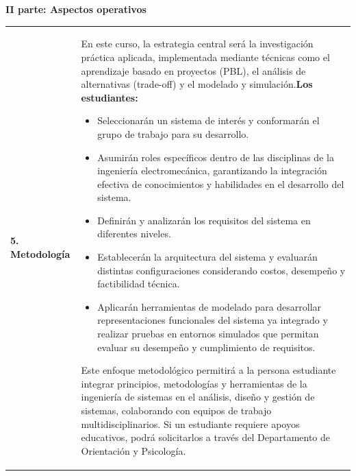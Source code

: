 \documentclass[letterpaper]{article}%
\begin{document}
\newpage%
\par\fontsize{14}{0}\selectfont \textbf{\textcolor{parte}{II parte: Aspectos operativos}}%
\vspace*{4mm}%
\newline%
\fontsize{10}{12}\selectfont %
\begin{tabularx}{\textwidth}{p{3cm}p{13cm}}%
\par\fontsize{12}{14}\selectfont \textbf{\textcolor{parte}{5. Metodología}}&En este curso, la estrategia central será la investigación práctica aplicada, implementada mediante técnicas como el aprendizaje basado en proyectos (PBL), el análisis de alternativas (trade-off) y el modelado y simulación.\newline\newline \textbf{Los estudiantes:}\begin{itemize}\item Seleccionarán un sistema de interés y conformarán el grupo de trabajo para su desarrollo.\item Asumirán roles específicos dentro de las disciplinas de la ingeniería electromecánica, garantizando la integración efectiva de conocimientos y habilidades en el desarrollo del sistema.\item Definirán y analizarán los requisitos del sistema en diferentes niveles.\item Establecerán la arquitectura del sistema y evaluarán distintas configuraciones considerando costos, desempeño y factibilidad técnica.\item Aplicarán herramientas de modelado para desarrollar representaciones funcionales del sistema ya integrado y realizar pruebas en entornos simulados que permitan evaluar su desempeño y cumplimiento de requisitos.\end{itemize}\vspace*{2mm}Este enfoque metodológico permitirá a la persona estudiante integrar principios, metodologías y herramientas de la ingeniería de sistemas en el análisis, diseño y gestión de sistemas, colaborando con equipos de trabajo multidisciplinarios.\vspace*{2mm} \newline  Si un estudiante requiere apoyos educativos, podrá solicitarlos a través del Departamento de Orientación y Psicología.\\%
\end{tabularx}%
\vspace*{4mm}%
\newline%
\end{document}
